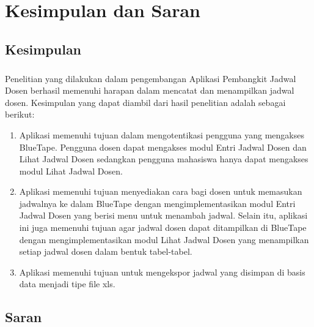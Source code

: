 \chapter{Kesimpulan dan Saran}
\section{Kesimpulan}
\paragraph{} Penelitian yang dilakukan dalam pengembangan Aplikasi Pembangkit Jadwal Dosen berhasil memenuhi harapan dalam mencatat dan menampilkan jadwal dosen. Kesimpulan yang dapat diambil dari hasil penelitian adalah sebagai berikut:
\begin{enumerate}
	\item Aplikasi memenuhi tujuan dalam mengotentikasi pengguna yang mengakses BlueTape. Pengguna dosen dapat mengakses modul Entri Jadwal Dosen dan Lihat Jadwal Dosen sedangkan pengguna mahasiswa hanya dapat mengakses modul Lihat Jadwal Dosen.
	\item Aplikasi memenuhi tujuan menyediakan cara bagi dosen untuk memasukan jadwalnya ke dalam BlueTape dengan mengimplementasikan modul Entri Jadwal Dosen yang berisi menu untuk menambah jadwal. Selain itu, aplikasi ini juga memenuhi tujuan agar jadwal dosen dapat ditampilkan di BlueTape dengan mengimplementasikan modul Lihat Jadwal Dosen yang menampilkan setiap jadwal dosen dalam bentuk tabel-tabel.
	\item Aplikasi memenuhi tujuan untuk mengekspor jadwal yang disimpan di basis data menjadi tipe file xls.
\end{enumerate}

\section{Saran}